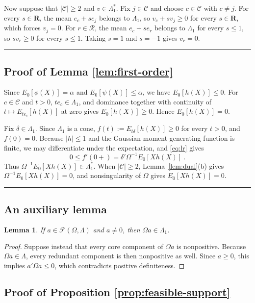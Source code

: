 \documentclass[11pt]{article}
\newcommand{\red}[1]{{\color{red}#1}} %
\numberwithin{equation}{section}
\def\qed{\rule{2mm}{2mm}}
\newtheorem{lemma}{Lemma}
\theoremstyle{definition}
\begin{document}
Now suppose that $|\mathcal C|\ge2$ and $v\in\Lambda_1^*$. Fix $j\in\mathcal C$ and choose $c\in\mathcal C$ with $c\ne j$. For every $s\in\mathbf R$, the mean $e_c+se_j$ belongs to $\Lambda_1$, so $v_c+sv_j\ge0$ for every $s\in\mathbf R$, which forces $v_j=0$. For $r\in\mathcal R$, the mean $e_c+se_r$ belongs to $\Lambda_1$ for every $s\le1$, so $sv_r\ge0$ for every $s\le1$. Taking $s=1$ and $s=-1$ gives $v_r=0$. \qed

\subsection{Proof of Lemma \ref{lem:first-order}}

\red{Since $E_0[\phi(X)]=\alpha$ and $E_0[\psi(X)]\le\alpha$, we have $E_0[h(X)]\le0$.} For $c\in\mathcal C$ and $t>0$, $te_c\in\Lambda_1$, and dominance together with continuity of $t\mapsto E_{te_c}[h(X)]$ at zero gives $E_0[h(X)]\ge0$. Hence $E_0[h(X)]=0$.

Fix $\delta\in\Lambda_1$. Since $\Lambda_1$ is a cone, $f(t):=E_{t\delta}[h(X)]\ge0$ for every $t>0$, and $f(0)=0$. Because $|h|\le1$ and the Gaussian moment-generating function is finite, we may differentiate under the expectation, and \eqref{eq:lr} gives
\[
0\le f'(0+)=\delta'\Omega^{-1}E_0[Xh(X)]~.
\]
Thus $\Omega^{-1}E_0[Xh(X)]\in\Lambda_1^*$. When $|\mathcal C|\ge2$, Lemma~\ref{lem:dual}(b) gives $\Omega^{-1}E_0[Xh(X)]=0$, and nonsingularity of $\Omega$ gives $E_0[Xh(X)]=0$. \qed

\subsection{An auxiliary lemma}

\begin{lemma}\label{lem:feasible-alternative}
If $a\in\mathcal F(\Omega,\Lambda)$ and $a\ne0$, then $\Omega a\in\Lambda_1$.
\end{lemma}

\begin{proof}
Suppose instead that every core component of $\Omega a$ is nonpositive. Because $\Omega a\in\Lambda$, every redundant component is then nonpositive as well. Since $a\ge0$, this implies $a'\Omega a\le0$, which contradicts positive definiteness.
\end{proof}

\subsection{Proof of Proposition \ref{prop:feasible-support}}
\end{document}
